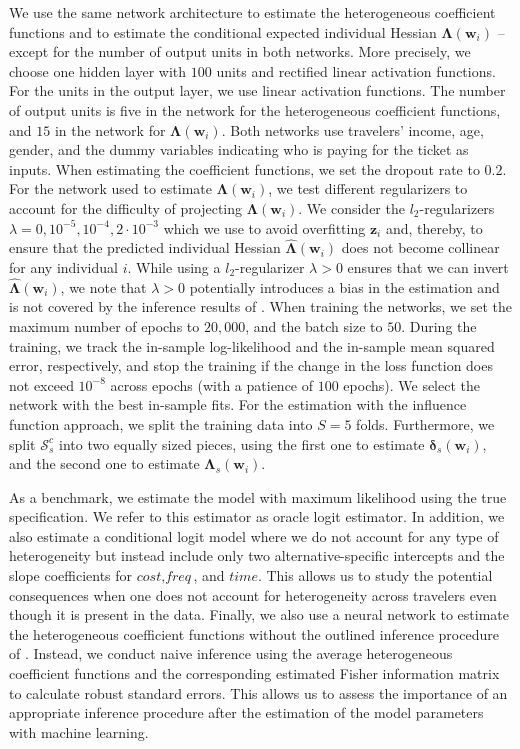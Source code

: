 \documentclass[a4paper, 12pt]{article}
\begin{document}
We use the same network architecture  to estimate the heterogeneous coefficient functions and to estimate the conditional expected individual Hessian $\bm{\Lambda}(\bm{w}_i)$ -- except for the number of output units in both networks. More precisely, we choose one hidden layer with $100$ units and rectified linear activation functions. For the units in the output layer, we use linear activation functions. The number of output units  is  five in the network for  the heterogeneous coefficient functions, and $15$ in the network for $\bm{\Lambda}(\bm{w}_i)$. Both networks use travelers' income, age, gender, and the dummy variables indicating who is paying for the ticket as inputs. When estimating the coefficient functions, we set the dropout rate to $0.2$. 
For the network used to estimate $\bm{\Lambda}(\bm{w}_i)$, we  test different regularizers to account for the difficulty of  projecting $\bm{\Lambda}(\bm{w}_i)$. We consider the $l_2$-regularizers $\lambda= 0, 10^{-5}, 10^{-4},2 \cdot 10^{-3}$ which we use to avoid overfitting $\bm{z}_i$ and, thereby, to ensure that the predicted individual Hessian  $\hat{\bm{\Lambda}}(\bm{w}_i)$ does not become collinear for any individual $i$.  While using a $l_2$-regularizer $\lambda > 0 $ ensures that we can invert $\hat{\bm{\Lambda}}(\bm{w}_i)$, we note that $\lambda > 0$ potentially introduces a bias in the estimation and is not covered by the inference results of .
When training the networks, we set the maximum number of epochs to $20,000$, and  the batch size to $50$. During the training, we track the in-sample log-likelihood and the in-sample mean squared error, respectively, and stop the training if the change in the loss function does not exceed $10^{-8}$ across epochs (with a patience of $100$ epochs). We select the network with the best in-sample fits. For the estimation with the influence function approach, we split the training data into $S=5$ folds. Furthermore, we split $\mathcal{S}^c_s$ into two equally sized pieces, using the first one to estimate $\bm{\delta}_s(\bm{w}_i)$, and the second one to estimate $\bm{\Lambda}_s(\bm{w}_i)$.

As a benchmark, we estimate the model with maximum likelihood using the true specification. We refer to this estimator as oracle logit estimator. 
In addition, we also estimate a conditional logit model where we do not account for any type of heterogeneity but instead include only two alternative-specific intercepts and the slope coefficients for $\textit{cost}, \textit{freq}$, and $\textit{time}$. This allows us to study the potential consequences when one does not account for heterogeneity across travelers even though it is present in the data. Finally, we also use a neural network to estimate the heterogeneous coefficient functions without the outlined inference procedure of . Instead, we conduct naive inference using the average heterogeneous coefficient functions and the corresponding estimated Fisher information matrix to calculate robust standard errors. This allows us to assess the importance of an appropriate inference procedure after the estimation of the model parameters with machine learning.
\end{document}
